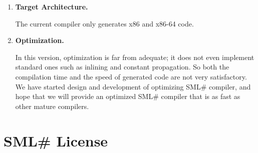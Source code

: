 \documentclass{jbook}
\newcommand{\txt}[2]{#2}
\newcommand{\smlsharp}{SML\#}
\begin{document}
\begin{enumerate}
\item {\bf Target Architecture.}

	The current compiler only generates x86 and x86-64 code.

\item {\bf Optimization.}

	In this version, optimization is far from adequate; it does not
even implement standard ones such as inlining and constant propagation.
	So both the compilation time and the speed of generated code are
not very satisfactory.
	We have started design and development of optimizing \smlsharp{}
compiler, and hope that we will provide an optimized \smlsharp{}
compiler that is as fast as other mature compilers.

%

%

%

\end{enumerate}
\fi%

\chapter{\txt{\smlsharp{}ライセンス}{\smlsharp{} License}}
\label{sec:smlsharpLicence}
\end{document}
